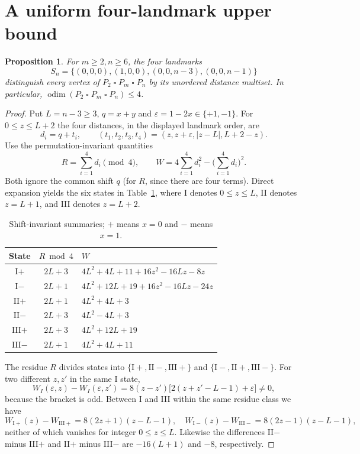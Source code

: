 \documentclass[10pt,a4paper]{article}
\newtheorem{proposition}{Proposition}
\newcommand{\odim}{\operatorname{odim}}
\newcommand{\boxp}{\mathbin{\square}}
\begin{document}
\section{A uniform four-landmark upper bound}\label{sec:upper}
\begin{proposition}\label{prop:upper}
For $m\ge2,n\ge6$, the four landmarks
\[S_n=\{(0,0,0),(1,0,0),(0,0,n-3),(0,0,n-1)\}\]
distinguish \emph{every} vertex of $P_2\boxp P_m\boxp P_n$ by its unordered distance multiset. In particular, $\odim(P_2\boxp P_m\boxp P_n)\le4$.
\end{proposition}
\begin{proof}
Put $L=n-3\ge3$, $q=x+y$ and $\varepsilon=1-2x\in\{+1,-1\}$. For $0\le z\le L+2$ the four distances, in the displayed landmark order, are
\[d_i=q+t_i,\qquad(t_1,t_2,t_3,t_4)=(z,z+\varepsilon,|z-L|,L+2-z).\]
Use the permutation-invariant quantities
\[R=\sum_{i=1}^{4}d_i\pmod4,\qquad W=4\sum_{i=1}^{4}d_i^2-\Big(\sum_{i=1}^{4}d_i\Big)^2.\]
Both ignore the common shift $q$ (for $R$, since there are four terms). Direct expansion yields the six states in Table~\ref{tab:moments}, where I denotes $0\le z\le L$, II denotes $z=L+1$, and III denotes $z=L+2$.
\begin{table}[ht]\centering\small
\caption{Shift-invariant summaries; $+$ means $x=0$ and $-$ means $x=1$.}\label{tab:moments}
\begin{tabular}{@{}ccl@{}}\toprule
State & $R\bmod4$ & $W$\\\midrule
I$+$ & $2L+3$ & $4L^2+4L+11+16z^2-16Lz-8z$\\
I$-$ & $2L+1$ & $4L^2+12L+19+16z^2-16Lz-24z$\\
II$+$ & $2L+1$ & $4L^2+4L+3$\\
II$-$ & $2L+3$ & $4L^2-4L+3$\\
III$+$ & $2L+3$ & $4L^2+12L+19$\\
III$-$ & $2L+1$ & $4L^2+4L+11$\\\bottomrule
\end{tabular}
\end{table}

The residue $R$ divides states into $\{\mathrm{I+},\mathrm{II-},\mathrm{III+}\}$ and $\{\mathrm{I-},\mathrm{II+},\mathrm{III-}\}$. For two different $z,z'$ in the same I state,
\[W_I(\varepsilon,z)-W_I(\varepsilon,z')=8(z-z')\bigl[2(z+z'-L-1)+\varepsilon\bigr]\ne0,\]
because the bracket is odd. Between I and III within the same residue class we have
\[
W_{\mathrm{I+}}(z)-W_{\mathrm{III+}}=8(2z+1)(z-L-1),\quad
W_{\mathrm{I-}}(z)-W_{\mathrm{III-}}=8(2z-1)(z-L-1),
\]
neither of which vanishes for integer $0\le z\le L$. Likewise the differences II$-$ minus III$+$ and II$+$ minus III$-$ are $-16(L+1)$ and $-8$, respectively.


\end{proof}
\end{document}
